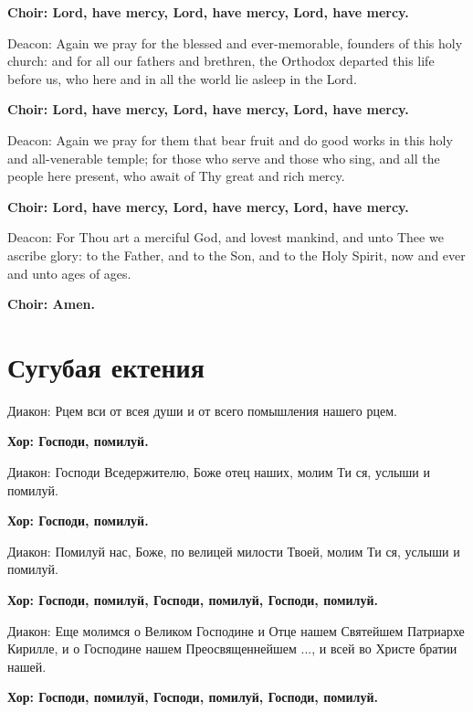 \documentclass[12pt,a4paper,titlepage]{report}
\begin{document}
\begin{paracol}[1]{2}
  \textbf{Choir: Lord, have mercy, Lord, have mercy, Lord, have mercy.}

  Deacon: Again we pray for the blessed and ever-memorable, founders of this holy church: and for all our fathers and brethren, the Orthodox departed this life before us, who here and in all the world lie asleep in the Lord.

  \textbf{Choir: Lord, have mercy, Lord, have mercy, Lord, have mercy.}

  Deacon: Again we pray for them that bear fruit and do good works in this holy and all-venerable temple; for those who serve and those who sing, and all the people here present, who await of Thy great and rich mercy.

  \textbf{Choir: Lord, have mercy, Lord, have mercy, Lord, have mercy.}

  Deacon: For Thou art a merciful God, and lovest mankind, and unto Thee we ascribe glory: to the Father, and to the Son, and to the Holy Spirit, now and ever and unto ages of ages.

  \textbf{Choir: Amen.}

  \switchcolumn[1]

  \section*{Сугубая ектения}

  Диакон: Рцем вси от всея души и от всего помышления нашего рцем.

  \textbf{Хор: Господи, помилуй.}

  Диакон: Господи Вседержителю, Боже отец наших, молим Ти ся, услыши и помилуй.

  \textbf{Хор: Господи, помилуй.}

  Диакон: Помилуй нас, Боже, по велицей милости Твоей, молим Ти ся, услыши и помилуй.

  \textbf{Хор: Господи, помилуй, Господи, помилуй, Господи, помилуй.}

  Диакон: Еще молимся о Великом Господине и Отце нашем Святейшем Патриархе Кирилле, и о Господине нашем Преосвященнейшем ..., и всей во Христе братии нашей.

  \textbf{Хор: Господи, помилуй, Господи, помилуй, Господи, помилуй.}


\end{paracol}
\end{document}
